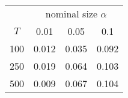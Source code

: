 % 
\begin{tabular}{cccc}
  \hline
  & \multicolumn{3}{c}{nominal size $\alpha$} \\
 $T$ & 0.01 & 0.05 & 0.1 \\
 \hline
100 & 0.012 & 0.035 & 0.092 \\ 
  250 & 0.019 & 0.064 & 0.103 \\ 
  500 & 0.009 & 0.067 & 0.104 \\ 
   \hline
\end{tabular}
